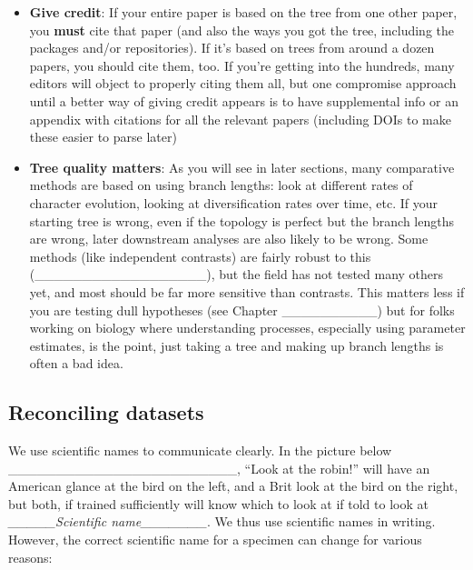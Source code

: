 \documentclass[
]{article}
\providecommand{\tightlist}{%
  \setlength{\itemsep}{0pt}\setlength{\parskip}{0pt}}
\begin{document}
\begin{itemize}
\tightlist
\item
  \textbf{Give credit}: If your entire paper is based on the tree from one other paper, you \textbf{must} cite that paper (and also the ways you got the tree, including the packages and/or repositories). If it's based on trees from around a dozen papers, you should cite them, too. If you're getting into the hundreds, many editors will object to properly citing them all, but one compromise approach until a better way of giving credit appears is to have supplemental info or an appendix with citations for all the relevant papers (including DOIs to make these easier to parse later)
\item
  \textbf{Tree quality matters}: As you will see in later sections, many comparative methods are based on using branch lengths: look at different rates of character evolution, looking at diversification rates over time, etc. If your starting tree is wrong, even if the topology is perfect but the branch lengths are wrong, later downstream analyses are also likely to be wrong. Some methods (like independent contrasts) are fairly robust to this (\_\_\_\_\_\_\_\_\_\_\_\_\_\_\_\_\_\_), but the field has not tested many others yet, and most should be far more sensitive than contrasts. This matters less if you are testing dull hypotheses (see Chapter \_\_\_\_\_\_\_\_\_\_) but for folks working on biology where understanding processes, especially using parameter estimates, is the point, just taking a tree and making up branch lengths is often a bad idea.
\end{itemize}

\hypertarget{reconciling-datasets}{%
\subsection{Reconciling datasets}\label{reconciling-datasets}}

We use scientific names to communicate clearly. In the picture below \_\_\_\_\_\_\_\_\_\_\_\_\_\_\_\_\_\_\_\_\_\_\_\_, ``Look at the robin!'' will have an American glance at the bird on the left, and a Brit look at the bird on the right, but both, if trained sufficiently will know which to look at if told to look at \emph{\_\_\_\_\_Scientific name\_\_\_\_\_\_\_}. We thus use scientific names in writing. However, the correct scientific name for a specimen can change for various reasons:
\end{document}
